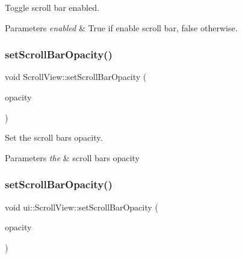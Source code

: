 Toggle scroll bar enabled. 


\begin{DoxyParams}{Parameters}
{\em enabled} & True if enable scroll bar, false otherwise. \\
\hline
\end{DoxyParams}
\mbox{\label{classui_1_1ScrollView_ac5d6dca70e4843a9c22d896a2881aa76}} 
\subsubsection{\texorpdfstring{set\+Scroll\+Bar\+Opacity()}{setScrollBarOpacity()}\hspace{0.1cm}{\footnotesize\ttfamily [1/2]}}
{\footnotesize\ttfamily void Scroll\+View\+::set\+Scroll\+Bar\+Opacity (\begin{DoxyParamCaption}\item[{G\+Lubyte}]{opacity }\end{DoxyParamCaption})}



Set the scroll bar\textquotesingle{}s opacity. 


\begin{DoxyParams}{Parameters}
{\em the} & scroll bar\textquotesingle{}s opacity \\
\hline
\end{DoxyParams}
\mbox{\label{classui_1_1ScrollView_aefcd0a36405be35892b5543a841f9c04}} 
\subsubsection{\texorpdfstring{set\+Scroll\+Bar\+Opacity()}{setScrollBarOpacity()}\hspace{0.1cm}{\footnotesize\ttfamily [2/2]}}
{\footnotesize\ttfamily void ui\+::\+Scroll\+View\+::set\+Scroll\+Bar\+Opacity (\begin{DoxyParamCaption}\item[{G\+Lubyte}]{opacity }\end{DoxyParamCaption})}



